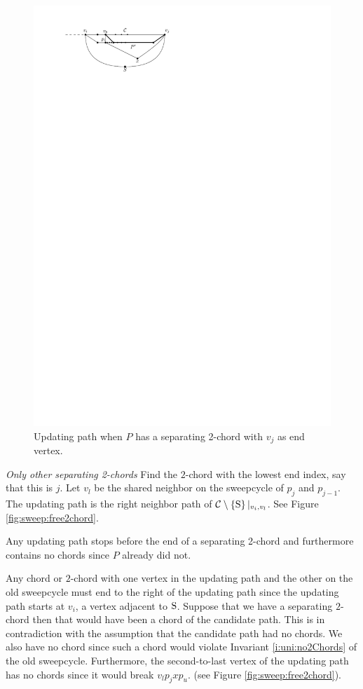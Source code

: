     \begin{figure}[h]
      \centering
      \includegraphics[scale=1]{unifiedAlgo/img/sweep/cases/pEBound}
      \caption{Updating path when $P$ has a separating 2-chord with $v_j$ as end vertex.}
      \label{fig:sweep:pEBound}
    \end{figure}

    \emph{Only other separating 2-chords}
      Find the $2$-chord with the lowest end index, say that this is $j$.
      Let $v_l$ be the shared neighbor on the sweepcycle of $p_{j}$ and $p_{j-1}$.
      The updating path is the right neighbor path of $\mathcal{C} \setminus \left\lbrace {\mathrm{S}} \right\rbrace|_{v_i, v_l}$. See Figure \ref{fig:sweep:free2chord}.

      Any updating path stops before the end of a separating 2-chord and furthermore contains no chords since $P$ already did not.

      Any chord or $2$-chord with one vertex in the updating path and the other on the old sweepcycle must end to the right of the updating path since the updating path starts at $v_i$, a vertex adjacent to $\mathrm{S}$.
      Suppose that we have a separating $2$-chord then that would have been a chord of the candidate path. This is in contradiction with the assumption that the candidate path had no chords.
      We also have no chord since such a chord would violate Invariant \ref{i:uni:no2Chords} of the old sweepcycle. Furthermore, the second-to-last vertex of the updating path has no chords since it would break $v_l p_j x p_u$. (see Figure \ref{fig:sweep:free2chord}).

